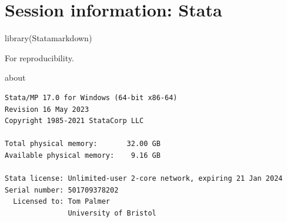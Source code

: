 \documentclass[
  10pt,
  a4paper,
]{book}
\newenvironment{Shaded}{\begin{snugshade}}{\end{snugshade}}
\newcommand{\FunctionTok}[1]{\textcolor[rgb]{0.28,0.35,0.67}{#1}}
\newcommand{\NormalTok}[1]{\textcolor[rgb]{0.00,0.46,0.62}{#1}}
\begin{document}
\hypertarget{session-information-stata}{%
\chapter*{Session information: Stata}\label{session-information-stata}}

\begin{Shaded}
\begin{Highlighting}[]
\FunctionTok{library}\NormalTok{(Statamarkdown)}
\end{Highlighting}
\end{Shaded}

For reproducibility.

\begin{Shaded}
\begin{Highlighting}[]
\NormalTok{about}
\end{Highlighting}
\end{Shaded}

\begin{verbatim}
Stata/MP 17.0 for Windows (64-bit x86-64)
Revision 16 May 2023
Copyright 1985-2021 StataCorp LLC

Total physical memory:       32.00 GB
Available physical memory:    9.16 GB

Stata license: Unlimited-user 2-core network, expiring 21 Jan 2024
Serial number: 501709378202
  Licensed to: Tom Palmer
               University of Bristol
\end{verbatim}
\end{document}
